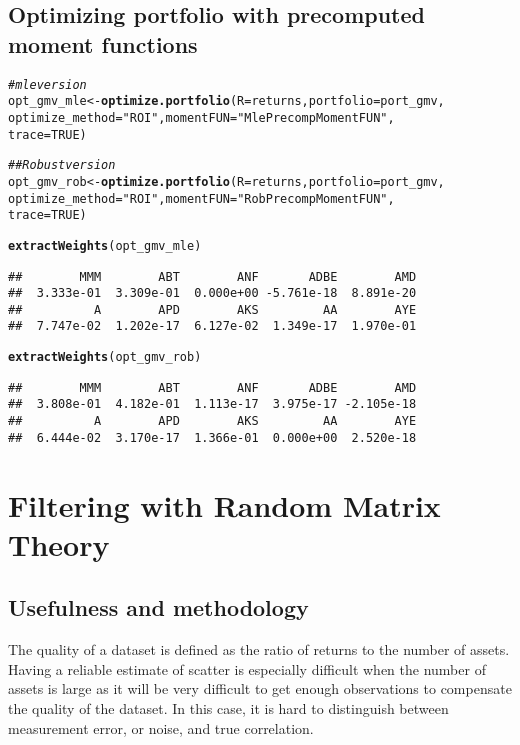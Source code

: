 \documentclass[12pt,letterpaper,english]{article}\usepackage[]{graphicx}\usepackage[]{color}
\makeatletter
\newcommand{\hlnum}[1]{\textcolor[rgb]{0.686,0.059,0.569}{#1}}%
\newcommand{\hlstr}[1]{\textcolor[rgb]{0.192,0.494,0.8}{#1}}%
\newcommand{\hlcom}[1]{\textcolor[rgb]{0.678,0.584,0.686}{\textit{#1}}}%
\newcommand{\hlstd}[1]{\textcolor[rgb]{0.345,0.345,0.345}{#1}}%
\newcommand{\hlkwb}[1]{\textcolor[rgb]{0.69,0.353,0.396}{#1}}%
\newcommand{\hlkwc}[1]{\textcolor[rgb]{0.333,0.667,0.333}{#1}}%
\newcommand{\hlkwd}[1]{\textcolor[rgb]{0.737,0.353,0.396}{\textbf{#1}}}%
\newenvironment{kframe}{%
 \def\at@end@of@kframe{}%
 \ifinner\ifhmode%
  \def\at@end@of@kframe{\end{minipage}}%
  \begin{minipage}{\columnwidth}%
 \fi\fi%
 \def\FrameCommand##1{\hskip\@totalleftmargin \hskip-\fboxsep
 \colorbox{shadecolor}{##1}\hskip-\fboxsep
     \hskip-\linewidth \hskip-\@totalleftmargin \hskip\columnwidth}%
 \MakeFramed {\advance\hsize-\width
   \@totalleftmargin\z@ \linewidth\hsize
   \@setminipage}}%
 {\par\unskip\endMakeFramed%
 \at@end@of@kframe}
\newenvironment{knitrout}{}{} %
\makeatother
\begin{document}
\subsection{Optimizing portfolio with precomputed moment functions}
\begin{knitrout}
\color{fgcolor}\begin{kframe}
\begin{alltt}
\hlcom{# mle version}
\hlstd{opt_gmv_mle} \hlkwb{<-} \hlkwd{optimize.portfolio}\hlstd{(}\hlkwc{R} \hlstd{= returns,} \hlkwc{portfolio} \hlstd{= port_gmv,}
    \hlkwc{optimize_method} \hlstd{=} \hlstr{"ROI"}\hlstd{,} \hlkwc{momentFUN} \hlstd{=} \hlstr{"MlePrecompMomentFUN"}\hlstd{,}
    \hlkwc{trace} \hlstd{=} \hlnum{TRUE}\hlstd{)}

\hlcom{## Robust version}
\hlstd{opt_gmv_rob} \hlkwb{<-} \hlkwd{optimize.portfolio}\hlstd{(}\hlkwc{R} \hlstd{= returns,} \hlkwc{portfolio} \hlstd{= port_gmv,}
    \hlkwc{optimize_method} \hlstd{=} \hlstr{"ROI"}\hlstd{,} \hlkwc{momentFUN} \hlstd{=} \hlstr{"RobPrecompMomentFUN"}\hlstd{,}
    \hlkwc{trace} \hlstd{=} \hlnum{TRUE}\hlstd{)}


\hlkwd{extractWeights}\hlstd{(opt_gmv_mle)}
\end{alltt}
\begin{verbatim}
##        MMM        ABT        ANF       ADBE        AMD 
##  3.333e-01  3.309e-01  0.000e+00 -5.761e-18  8.891e-20 
##          A        APD        AKS         AA        AYE 
##  7.747e-02  1.202e-17  6.127e-02  1.349e-17  1.970e-01
\end{verbatim}
\begin{alltt}
\hlkwd{extractWeights}\hlstd{(opt_gmv_rob)}
\end{alltt}
\begin{verbatim}
##        MMM        ABT        ANF       ADBE        AMD 
##  3.808e-01  4.182e-01  1.113e-17  3.975e-17 -2.105e-18 
##          A        APD        AKS         AA        AYE 
##  6.444e-02  3.170e-17  1.366e-01  0.000e+00  2.520e-18
\end{verbatim}
\end{kframe}
\end{knitrout}

\section{Filtering with Random Matrix Theory}
\subsection{Usefulness and methodology}
The quality of a dataset is defined as the ratio of returns to the number of assets.
Having a reliable estimate of scatter is especially difficult when the number of assets is large as it will be very difficult to get enough observations to compensate the quality of the dataset. In this case, it is hard to distinguish between measurement error, or noise, and true correlation.
\end{document}
